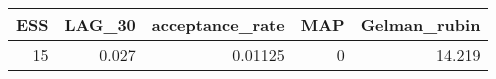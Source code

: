 \begin{longtable}{rrrrr}
\toprule
ESS & LAG\_30 & acceptance\_rate & MAP & Gelman\_rubin \\ 
\midrule
15 & 0.027 & 0.01125 & 0 & 14.219 \\ 
\bottomrule
\end{longtable}

